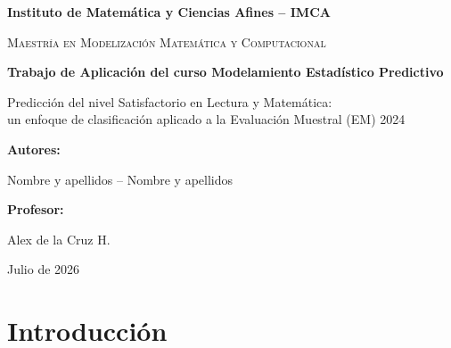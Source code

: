 \documentclass[11pt]{article}
\begin{document}
\begin{titlepage}
\centering

{\bfseries\large
Instituto de Matemática y Ciencias Afines -- IMCA
\par}

\vspace{0.1cm}

{\scshape\large
Maestría en Modelización Matemática y Computacional
\par}

\vspace{5.5cm}

{\bfseries\large
Trabajo de Aplicación del curso Modelamiento Estadístico Predictivo
\par}

\vspace{0.5cm}

{\Large\color{blue}
Predicción del nivel Satisfactorio en Lectura y Matemática:\\
un enfoque de clasificación aplicado a la Evaluación Muestral (EM) 2024
\par}


\vspace{1cm}


\vfill

{\large\bfseries Autores:\par}
\vspace{0.3cm}
{\large Nombre y apellidos -- Nombre y apellidos\par}

\vfill

{\large\bfseries Profesor:\par}
\vspace{0.3cm}
{\large Alex de la Cruz H.\par}

\vfill

{\large Julio de 2026\par}

\end{titlepage}

\tableofcontents

\newpage

\section{Introducción}
\end{document}
